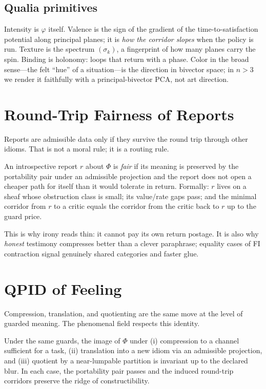 \documentclass[11pt]{article}
\newcommand{\1}{\mathbf{1}}
\begin{document}
\subsection*{Qualia primitives}
Intensity is $\varphi$ itself. Valence is the sign of the gradient of the time-to-satisfaction potential along principal planes; it is \emph{how the corridor slopes} when the policy is run. Texture is the spectrum $(\sigma_k)$, a fingerprint of how many planes carry the spin. Binding is holonomy: loops that return with a phase. Color in the broad sense---the felt ``hue'' of a situation---is the direction in bivector space; in $n>3$ we render it faithfully with a principal-bivector PCA, not art direction.

\section{Round-Trip Fairness of Reports}
Reports are admissible data only if they survive the round trip through other idioms. That is not a moral rule; it is a routing rule.

\begin{claim}
An introspective report $r$ about $\Phi$ is \emph{fair} if its meaning is preserved by the portability pair under an admissible projection and the report does not open a cheaper path for itself than it would tolerate in return. Formally: $r$ lives on a sheaf whose obstruction class is small; its value/rate gaps pass; and the minimal corridor from $r$ to a critic equals the corridor from the critic back to $r$ up to the guard price.
\end{claim}

This is why irony reads thin: it cannot pay its own return postage. It is also why \emph{honest} testimony compresses better than a clever paraphrase; equality cases of FI contraction signal genuinely shared categories and faster glue.

\section{QPID of Feeling}
Compression, translation, and quotienting are the same move at the level of guarded meaning. The phenomenal field respects this identity.

\begin{thm}
Under the same guards, the image of $\Phi$ under (i) compression to a channel sufficient for a task, (ii) translation into a new idiom via an admissible projection, and (iii) quotient by a near-lumpable partition is invariant up to the declared blur. In each case, the portability pair passes and the induced round-trip corridors preserve the ridge of constructibility.
\end{thm}
\end{document}
